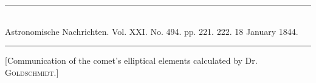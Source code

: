 \bigskip
\hypertarget{native-469-notice1844}{}
\begin{center}
\rule{0.55\linewidth}{0.4pt}\\[2pt]
Astronomische Nachrichten. Vol. XXI. No. 494. pp. 221. 222. 18 January 1844.\\[2pt]
\rule{0.55\linewidth}{0.4pt}
\end{center}

[Communication of the comet’s elliptical elements calculated by Dr. \textsc{Goldschmidt}.]


